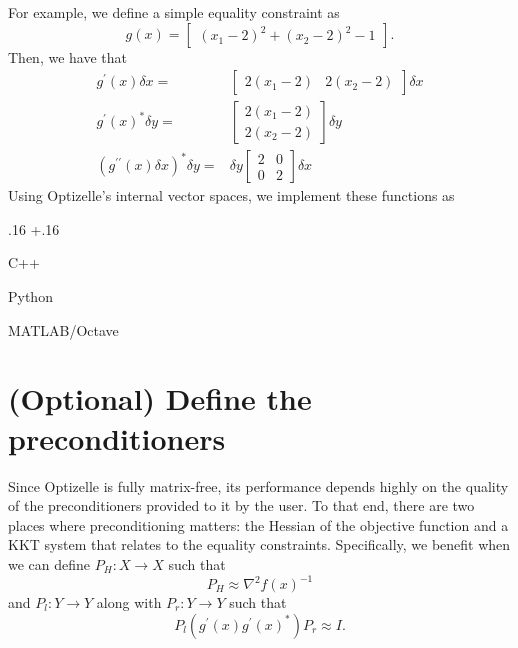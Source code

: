 \documentclass{report}
\newenvironment{boldlist}
    {\begin{list}{}{
        \labelwidth.16\textwidth
        \leftmargin\dimexpr\leftmargin+.16\textwidth
        \renewcommand\makelabel[1]{%
            \textbf{##1}}}}
    {\vspace{-\dimexpr\baselineskip+2\itemsep}\end{list}}
\newcommand{\exampleitem}[2]{
    \item[Language] #1
    \item[Code] #2
    \item[]}
\newcommand{\secpreconditioners}{(Optional) Define the preconditioners}
\begin{document}
        For example, we define a simple equality constraint as 
$$
    g(x)=\begin{bmatrix}
        (x_1-2)^2 + (x_2-2)^2 - 1
    \end{bmatrix}.
$$
Then, we have that
\begin{align*}
    g^\prime(x)\delta x=&\begin{bmatrix}
        2(x_1-2) & 2(x_2-2)
    \end{bmatrix}\delta x\\
    g^\prime(x)^*\delta y=&
        \begin{bmatrix}
            2(x_1-2)\\
            2(x_2-2)
        \end{bmatrix} \delta y\\
    (g^{\prime\prime}(x)\delta x)^*\delta y=&
        \delta y \begin{bmatrix}
            2 & 0\\
            0 & 2
        \end{bmatrix}\delta x
\end{align*}
Using Optizelle's internal vector spaces, we implement these functions as 
\begin{boldlist}
    \exampleitem
        {C++}
        {}

    \exampleitem
        {Python}
        {}

    \exampleitem
        {MATLAB/Octave}
        {}
\end{boldlist}

\section{\secpreconditioners}\label{sec:preconditioners}

        Since Optizelle is fully matrix-free, its performance depends highly on the quality of the preconditioners provided to it by the user.  To that end, there are two places where preconditioning matters:  the Hessian of the objective function and a KKT system that relates to the equality constraints.  Specifically, we benefit when we can define $P_H:X\rightarrow X$ such that
$$
        P_H \approx \nabla^2 f(x)^{-1}
$$
and $P_l:Y\rightarrow Y$ along with $P_r:Y\rightarrow Y$ such that
$$
        P_l(g^\prime(x)g^\prime(x)^*)P_r\approx I.
$$
        
\end{document}
